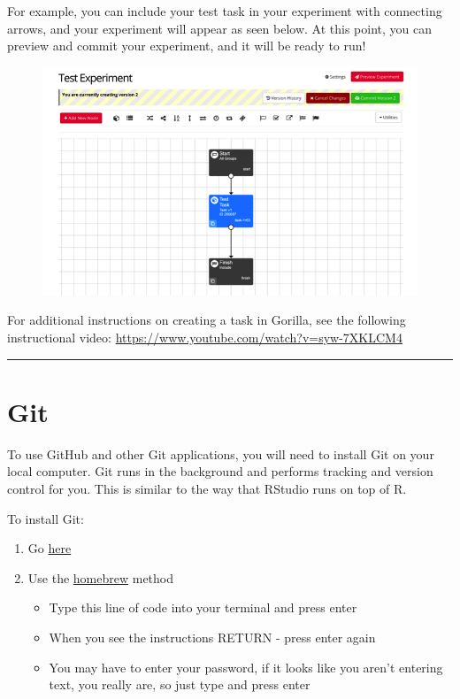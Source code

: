 \documentclass[]{book}
\providecommand{\tightlist}{%
  \setlength{\itemsep}{0pt}\setlength{\parskip}{0pt}}
\begin{document}
For example, you can include your test task in your experiment with connecting arrows, and your experiment will appear as seen below. At this point, you can preview and commit your experiment, and it will be ready to run!

\begin{figure}
\centering
\includegraphics{images/research_protocols/gorilla/gorilla28.png}
\caption{}
\end{figure}

For additional instructions on creating a task in Gorilla, see the following instructional video: \url{https://www.youtube.com/watch?v=syw-7XKLCM4}

\begin{center}\rule{0.5\linewidth}{0.5pt}\end{center}

\hypertarget{git}{%
\section{Git}\label{git}}

To use GitHub and other Git applications, you will need to install Git on your local computer. Git runs in the background and performs tracking and version control for you. This is similar to the way that RStudio runs on top of R.

To install Git:

\begin{enumerate}
\def\labelenumi{\arabic{enumi}.}
\tightlist
\item
  Go \href{https://git-scm.com/downloads}{here}
\item
  Use the \href{https://brew.sh/}{homebrew} method

  \begin{itemize}
  \tightlist
  \item
    Type this line of code into your terminal and press enter
  \item
    When you see the instructions RETURN - press enter again
  \item
    You may have to enter your password, if it looks like you aren't entering text, you really are, so just type and press enter
  \end{itemize}
\end{enumerate}
\end{document}
